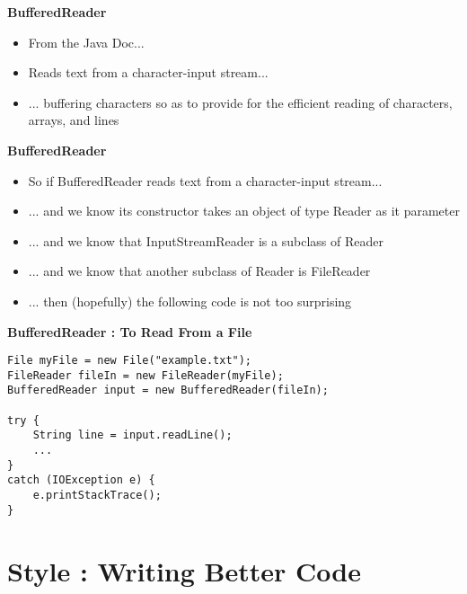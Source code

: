 \documentclass{beamer}
\begin{document}
\begin{frame}[fragile]
\begin{center}
\textbf{BufferedReader}
\end{center}
\begin{itemize}
\item From the Java Doc...
\bigskip
\item Reads text from a character-input stream...
\item ... buffering characters so as to provide for the efficient reading of characters, arrays, and lines
\end{itemize}
\end{frame}

\begin{frame}[fragile]
\begin{center}
\textbf{BufferedReader}
\end{center}
\begin{itemize}
\item So if BufferedReader reads text from a character-input stream...
\item ... and we know its constructor takes an object of type Reader as it parameter
\item ... and we know that InputStreamReader is a subclass of Reader
\item ... and we know that another subclass of Reader is FileReader
\item ... then (hopefully) the following code is not too surprising 
\end{itemize}
\end{frame}

\begin{frame}[fragile]
\begin{center}
\textbf{BufferedReader : To Read From a File}
\end{center}
\begin{block}{}
\begin{lstlisting}
File myFile = new File("example.txt");
FileReader fileIn = new FileReader(myFile);
BufferedReader input = new BufferedReader(fileIn);

try {
    String line = input.readLine();
    ...
}
catch (IOException e) {
    e.printStackTrace();
}
\end{lstlisting}
\end{block}
\end{frame}

\section{Style : Writing Better Code}
\end{document}
